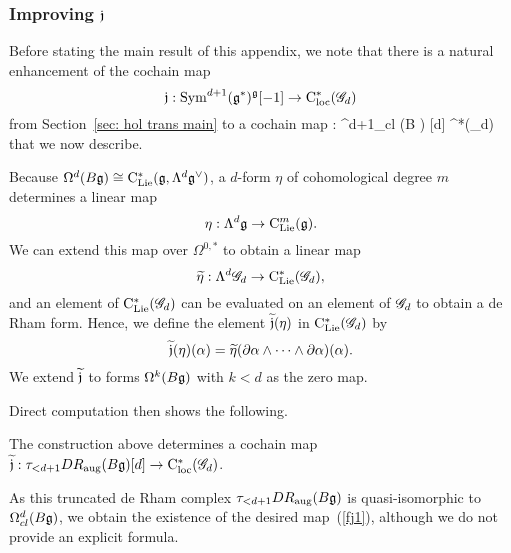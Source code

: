 \subsubsection{Improving $\mathfrak j$}

Before stating the main result of this appendix, we note that there is a natural enhancement of the cochain map
\[
\mathfrak j : {\rm Sym}^{d+1} (\mathfrak g^*)^{\mathfrak g} [-1] \to {\rm C}_{\rm loc}^*(\mathscr G_d)
\]
from Section~\ref{sec: hol trans main} to a cochain map
\beqn\label{fj1}
\fj : \Omega^{d+1}_{cl} (B \fg) [d] \to \cloc^*(\sG_d)  
\eeqn
that we now describe. 

Because $\Omega^d(B \mathfrak g) \cong {\rm C}_{{\rm Lie}}^*(\mathfrak g, \Lambda^{d} \mathfrak g^\vee)$, 
a $d$-form $\eta$ of cohomological degree $m$ determines a linear map
\[
\eta: \Lambda^d \mathfrak g \to {\rm C}_{{\rm Lie}}^m(\mathfrak g).
\]
We can extend this map over $\Omega^{0,*}$ to obtain a linear map
\[
\widetilde{\eta}: \Lambda^d \mathscr G_d \to {\rm C}_{{\rm Lie}}^*(\mathscr G_d),
\]
and an element of ${\rm C}_{{\rm Lie}}^*(\mathscr G_d)$ can be evaluated on an element of $\mathscr G_d$ to obtain a de Rham form.
Hence, we define the element $\widetilde{\mathfrak j}(\eta)$ in ${\rm C}_{{\rm Lie}}^*(\mathscr G_d)$ by 
\[
\widetilde{\mathfrak j} (\eta) (\alpha) = \widetilde{\eta}(\partial \alpha \wedge \cdots \wedge \partial \alpha) (\alpha) .
\]
We extend $\widetilde{\mathfrak j}$ to forms $\Omega^k(B\mathfrak g)$ with $k < d$ as the zero map.

Direct computation then shows the following.

\begin{lem}
The construction above determines a cochain map $\widetilde{\mathfrak j}: \tau_{<d+1} DR_{\rm aug}(B\mathfrak g)[d] \to {\rm C}_{\rm loc}^*(\mathscr G_d)$. 
\end{lem}

As this truncated de Rham complex $\tau_{<d+1} DR_{\rm aug}(B\mathfrak g)$ is quasi-isomorphic to  $\Omega^d_{cl}(B\mathfrak g)$, 
we obtain the existence of the desired map~(\ref{fj1}),
although we do not provide an explicit formula.

%

